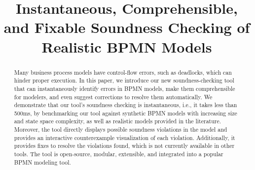 \documentclass[runningheads]{llncs}
\begin{document}
%
\title{Instantaneous, Comprehensible, and Fixable Soundness Checking of Realistic BPMN Models}
%

\maketitle
\begin{abstract}
Many business process models have control-flow errors, such as deadlocks, which can hinder proper execution.
In this paper, we introduce our new soundness-checking tool that can instantaneously identify errors in BPMN models, make them comprehensible for modelers, and even suggest corrections to resolve them automatically.
We demonstrate that our tool's soundness checking is instantaneous, i.e., it takes less than 500ms, by benchmarking our tool against synthetic BPMN models with increasing size and state space complexity, as well as realistic models provided in the literature.
Moreover, the tool directly displays possible soundness violations in the model and provides an interactive counterexample visualization of each violation.
Additionally, it provides fixes to resolve the violations found, which is not currently available in other tools.
The tool is open-source, modular, extensible, and integrated into a popular BPMN modeling tool.

\end{abstract}

\renewcommand{\labelenumi}{(\textbf{\arabic{enumi})}}
\end{document}

